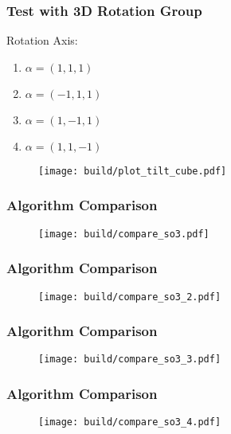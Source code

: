 \documentclass{beamer}
\begin{document}
% 
% 
% 
% 
% 
%
\begin{frame}
  \frametitle{Test with 3D Rotation Group}
  
  Rotation Axis:
  \begin{enumerate}
    \item $\alpha = (1,1,1)$
    \item $\alpha = (-1,1,1)$
    \item $\alpha = (1,-1,1)$
    \item $\alpha = (1,1,-1)$
  \end{enumerate}
  \begin{figure}
    \centering
    \texttt{[image: build/plot\_tilt\_cube.pdf]}
  \end{figure}
    
\end{frame}

\begin{frame}
  \frametitle{Algorithm Comparison}
  \begin{figure}
    \centering
    \texttt{[image: build/compare\_so3.pdf]}
  \end{figure}
\end{frame}
\begin{frame}
  \frametitle{Algorithm Comparison}
  \begin{figure}
    \centering
    \texttt{[image: build/compare\_so3\_2.pdf]}
  \end{figure}
\end{frame}
\begin{frame}
  \frametitle{Algorithm Comparison}
  \begin{figure}
    \centering
    \texttt{[image: build/compare\_so3\_3.pdf]}
  \end{figure}
\end{frame}
\begin{frame}
  \frametitle{Algorithm Comparison}
  \begin{figure}
    \centering
    \texttt{[image: build/compare\_so3\_4.pdf]}
  \end{figure}
\end{frame}

% 
% 
% 
% 
% 
%
    
\end{document}
